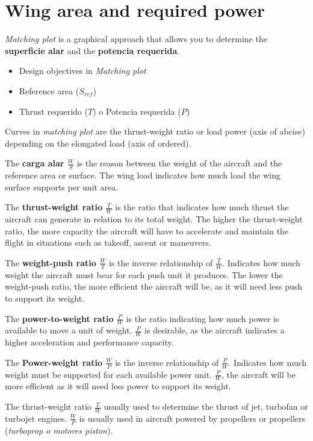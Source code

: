 \section{Wing area and required power}
\label{superficie alar y potencia requerida}

\textit{Matching plot} is a graphical approach that allows you to determine the \textbf{superficie alar} and the \textbf{potencia requerida}. 
\begin{itemize}
    \item[] Design objectives in \textit{Matching plot}
    \item Reference area ($S_{ref}$)
    \item Thrust requerido ($T$) o Potencia requerida ($P$)
\end{itemize}
%
Curves in \textit{matching plot} are the thrust-weight ratio or load power (axis of abcise) depending on the elongated load (axis of ordered). 

The \textbf{carga alar $\frac{W}{S}$} is the reason between the weight of the aircraft and the reference area or surface. The wing load indicates how much load the wing surface supports per unit area. 

The \textbf{thrust-weight ratio $\frac{T}{W}$} is the ratio that indicates how much thrust the aircraft can generate in relation to its total weight. The higher the thrust-weight ratio, the more capacity the aircraft will have to accelerate and maintain the flight in situations such as takeoff, ascent or maneuvers. 

The \textbf{weight-push ratio $\frac{W}{T}$} is the inverse relationship of $\frac{T}{W}$. Indicates how much weight the aircraft must bear for each push unit it produces. The lower the weight-push ratio, the more efficient the aircraft will be, as it will need less push to support its weight. 

The \textbf{power-to-weight ratio $\frac{P}{W}$} is the ratio indicating how much power is available to move a unit of weight. $\frac{P}{W}$ is desirable, as the aircraft indicates a higher acceleration and performance capacity. 

The \textbf{Power-weight ratio $\frac{W}{P}$} is the inverse relationship of $\frac{P}{W}$. Indicates how much weight must be supported for each available power unit. $\frac{P}{W}$, the aircraft will be more efficient as it will need less power to support its weight. 


The thrust-weight ratio $\frac{T}{W}$ usually used to determine the thrust of jet, turbofan or turbojet engines. $\frac{W}{P}$ is usually used in aircraft powered by propellers or propellers (\textit{turboprop o motores piston}).

